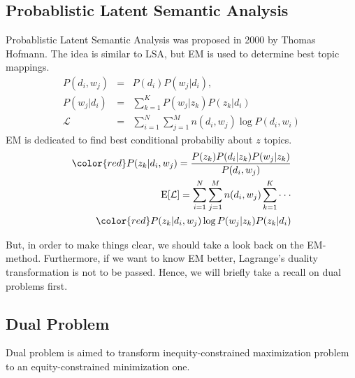 \documentclass[UTF8, 11pt, a4paper]{ctexart}
\begin{document}
\subsection{Probablistic Latent Semantic Analysis}
Probablistic Latent Semantic Analysis was proposed in 2000 by Thomas Hofmann.
The idea is similar to LSA, but EM is used to determine best topic mappings.
\begin{eqnarray}
P(d_i,w_j)& =& P(d_i) P(w_j | d_i), \\
P(w_j | d_i) &=& \sum_{k=1}^{K} P(w_j | z_k) P(z_k | d_i) \\
\mathcal{L} &=& \sum_{i=1}^N \sum_{j=1}^M n(d_i,w_j) \log P(d_i,w_i)
\end{eqnarray}
EM is dedicated to find best conditional probabiliy about $z$ topics.
\begin{eqnarray}
{\color{red} P(z_k|d_i,w_j) } = \frac{P(z_k)P(d_i|z_k)P(w_j|z_k)}{P(d_i,w_j)} \\
\text{E}[\mathcal{L}] =  \sum_{i=1}^N \sum_{j=1}^M n(d_i,w_j) \sum_{k=1}^{K} \cdot \cdot \cdot  \\
{\color{red} P(z_k|d_i,w_j) } \log  P(w_j|z_k)P(z_k|d_i)
\end{eqnarray}

But, in order to make things clear, we should take a look back on the EM-method.
Furthermore, if we want to know EM better, Lagrange's duality transformation is not to be passed. Hence, we will briefly take a recall on dual problems first.

\subsection{Dual Problem} 
Dual problem is aimed to transform inequity-constrained maximization problem to an equity-constrained minimization one.
\end{document}
